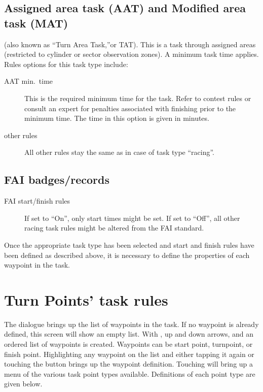 \subsection*{Assigned area task (AAT) and Modified area task (MAT)}
(also known as ``Turn Area Task,''or TAT).  This is a task through assigned
areas (restricted to cylinder or sector observation zones).  A minimum task time 
applies.  Rules options for this task type include:
  \begin{description}
  \item [AAT min.\ time]  This is the required minimum time for the task.  Refer
    to contest rules or consult an expert for penalties associated with finishing 
    prior to the minimum time.  The time in this option is given in minutes.
  \item [other rules] All other rules stay the same as in case of task type 
    ``racing''.
  \end{description}


\subsection*{FAI badges/records}
  \begin{description}
  \item [FAI start/finish rules] If set to ``On'', only start times might be set. 
  If set to ``Off'', all other racing task rules might be altered from the FAI standard.
  \end{description}

Once the appropriate task type has been selected and start and finish rules 
have been defined as described above, it is necessary to define the properties 
of each waypoint in the task.  

\section{Turn Points' task rules}\label{sec:task-rules}

The  dialogue brings up the list of waypoints in the task. 
 If no waypoint is already defined, this screen 
will show an empty list. With , up and down arrows, and 
 an ordered list of waypoints is created. 
Waypoints can be start point, turnpoint, or finish point.
Highlighting any waypoint on the list and either tapping it again or 
touching the  button brings up the waypoint definition. 
Touching  will bring up a menu of the various task point 
types available.  Definitions of each point type are given below.

